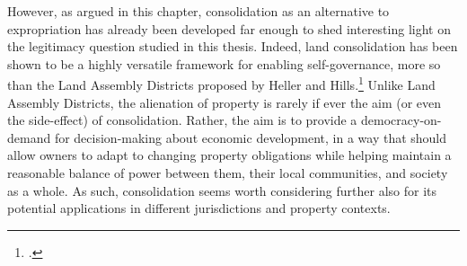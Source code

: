 However, as argued in this chapter, consolidation as an alternative to expropriation has already been developed far enough to shed interesting light on the legitimacy question studied in this thesis. Indeed, land consolidation has been shown to be a highly versatile framework for enabling self-governance, more so than the Land Assembly Districts proposed by Heller and Hills.\footcite{heller08} Unlike Land Assembly Districts, the alienation of property is rarely if ever the aim (or even the side-effect) of consolidation. Rather, the aim is to provide a democracy-on-demand for decision-making about economic development, in a way that should allow owners to adapt to changing property obligations while helping maintain a reasonable balance of power between them, their local communities, and society as a whole. As such, consolidation seems worth considering further also for its potential applications in different jurisdictions and property contexts.

